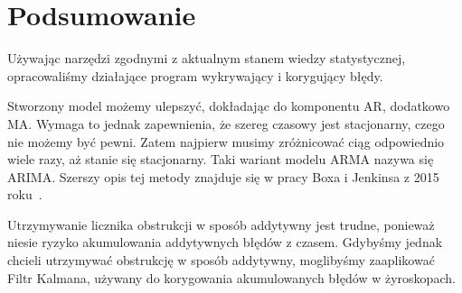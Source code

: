 \section{Podsumowanie}
Używając narzędzi zgodnymi z aktualnym stanem wiedzy statystycznej, opracowaliśmy działające program wykrywający i korygujący błędy.

Stworzony model możemy ulepszyć, dokładając do komponentu AR, dodatkowo MA. Wymaga to jednak zapewnienia, że szereg czasowy jest stacjonarny, czego nie możemy być pewni.
Zatem najpierw musimy zróżnicować ciąg odpowiednio wiele razy, aż stanie się stacjonarny.
Taki wariant modelu ARMA nazywa się ARIMA\@.
Szerszy opis tej metody znajduje się w pracy Boxa i Jenkinsa z 2015 roku~\cite{arima}.

Utrzymywanie licznika obstrukcji w sposób addytywny jest trudne, ponieważ niesie ryzyko akumulowania addytywnych błędów z czasem.
Gdybyśmy jednak chcieli utrzymywać obstrukcję w sposób addytywny, moglibyśmy zaaplikować Filtr Kalmana, używany do korygowania akumulowanych błędów w żyroskopach.